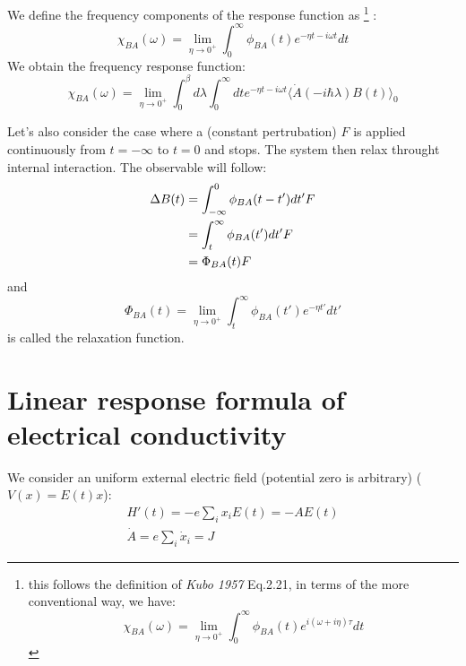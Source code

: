 \documentclass{article}
\begin{document}
We define the frequency components of the response function as
\footnote{this follows the definition of \emph{Kubo 1957} Eq.2.21, in terms
of the more conventional way, we have:
\begin{equation}
    \chi_{BA}(\omega) = \lim_{\eta\to 0^+} \int_{0}^{\infty} \phi_{BA} (t) e^{i(\omega+i\eta)\tau} dt
\end{equation}
}
:
\begin{equation}
    \chi_{BA}(\omega) = \lim_{\eta\to 0^+} \int_{0}^{\infty} \phi_{BA} (t) e^{-\eta t-i\omega t} dt
\end{equation}
We obtain the frequency response function:
\begin{equation}
    \chi_{BA}(\omega) = 
    \lim_{\eta\to 0^+} \int_0^{\beta} d\lambda \int_{0}^{\infty} dt e^{-\eta t-i\omega t} \langle \dot{A}(-i\hbar\lambda) B(t) \rangle_0 
\end{equation}

Let's also consider the case where a (constant pertrubation) $F$ is applied continuously from $t = -\infty$ to 
$t = 0$ and stops. The system then relax throught internal interaction. The observable will
follow:
\begin{align}
    \Delta B(t) &= \int_{-\infty}^{0} \phi_{BA} (t-t') dt' F \notag \\
                &= \int_{t}^{\infty} \phi_{BA} (t') dt' F \notag \\
                &= \Phi_{BA} (t) F
\end{align}
and
\begin{equation}
    \Phi_{BA} (t) = \lim_{\eta\to 0^+} \int_{t}^{\infty} \phi_{BA} (t') e^{-\eta t'} dt'
\end{equation}
is called the relaxation function.

\pagebreak
\section{Linear response formula of electrical conductivity}
We consider an uniform external electric field (potential zero is arbitrary) ($V(x) = E(t)x $):
\begin{gather}
    H'(t) = -e \sum_i x_i E(t) = - A E(t) \\
    \dot{A} = e \sum_i \dot{x}_i = J
\end{gather}
\end{document}
